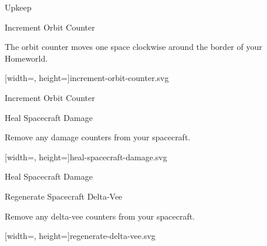\documentclass[twoside]{minimal}
\newenvironment{section}[1]
{\renewcommand{\title}{\begin{center} \fontsize{24.88}{32}\selectfont #1 \end{center}} \ignorespaces}
{\clearpage \ignorespacesafterend}
\newenvironment{supersection}[1]
{
\renewcommand{\title}{\begin{center} \fontsize{24.88}{32}\selectfont #1 \end{center}}
\renewenvironment{section}[1]
 {\title \renewcommand{\title}{\begin{flushleft} \fontsize{20.74}{28}\selectfont ##1 \end{flushleft}} \ignorespaces}
 {\clearpage \ignorespacesafterend}
\ignorespaces
}
{\clearpage \ignorespacesafterend}
\newcommand{\full}[3]{
\begin{diagram}
    \begin{center}
    {#2[width=\textwidth, height=\textheight]{#1}}
    \caption*{#3}
    \end{center}
\end{diagram}
}
\newcommand{\fullsvg}[2]{\full{#1}{}{#2}}
\begin{document}
\begin{supersection}{Upkeep}
    \begin{section}{Increment Orbit Counter}
        \title

        The orbit counter moves one space clockwise around the border of your Homeworld.

        \fullsvg{increment-orbit-counter.svg}{Incrementing the orbit counter}
    \end{section}

    \begin{section}{Heal Spacecraft Damage}
        \title

        Remove any damage counters from your spacecraft.

        \fullsvg{heal-spacecraft-damage.svg}{Healing spacecraft damage}
    \end{section}

    \begin{section}{Regenerate Spacecraft Delta-Vee}
        \title

        Remove any delta-vee counters from your spacecraft.

        \fullsvg{regenerate-delta-vee.svg}{Regenerating spacecraft delta-vee}
    \end{section}
\end{supersection}
\end{document}
